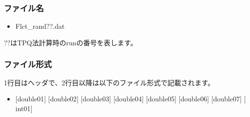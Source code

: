\subsubsection{ファイル名}
 \begin{itemize}
   \item Flct\_rand??.dat
  \end{itemize}
  ??はTPQ法計算時のrunの番号を表します。

\subsubsection{ファイル形式}
1行目はヘッダで、2行目以降は以下のファイル形式で記載されます。
 \begin{itemize}
   \item $[$double01$]$ $[$double02$]$ $[$double03$]$ $[$double04$]$ $[$double05$]$ $[$double06$]$ $[$double07$]$ $[$int01$]$
  \end{itemize}
